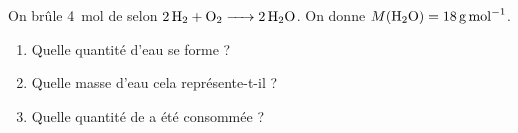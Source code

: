 \documentclass[11pt,a4paper]{article}
\begin{document}
\begin{exo}
On brûle \qty{4}{\mole} de  selon $\ce{2 H2 + O2 -> 2 H2O}$. On donne
$M(\ce{H2O})=\qty{18}{\gram\per\mole}$.
\begin{enumerate}[label=\alph*)]
  \item Quelle quantité d'eau se forme ?
  \item Quelle masse d'eau cela représente-t-il ?
  \item Quelle quantité de  a été consommée ?
\end{enumerate}
\end{exo}
\end{document}
